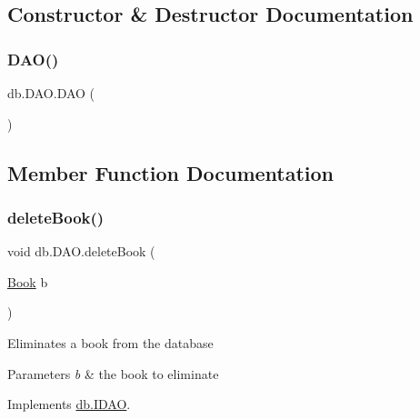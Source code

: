 \subsection{Constructor \& Destructor Documentation}
\mbox{\label{classdb_1_1_d_a_o_abd016ae9834e8d5e94d96f551d1636e7}} 
\subsubsection{\texorpdfstring{D\+A\+O()}{DAO()}}
{\footnotesize\ttfamily db.\+D\+A\+O.\+D\+AO (\begin{DoxyParamCaption}{ }\end{DoxyParamCaption})}



\subsection{Member Function Documentation}
\mbox{\label{classdb_1_1_d_a_o_a65f6a816c5f6dfb07178daf490f56fdc}} 
\subsubsection{\texorpdfstring{delete\+Book()}{deleteBook()}}
{\footnotesize\ttfamily void db.\+D\+A\+O.\+delete\+Book (\begin{DoxyParamCaption}\item[{\hyperlink{classserver_1_1data_1_1_book}{Book}}]{b }\end{DoxyParamCaption})}

Eliminates a book from the database 
\begin{DoxyParams}{Parameters}
{\em b} & the book to eliminate \\
\hline
\end{DoxyParams}


Implements \hyperlink{interfacedb_1_1_i_d_a_o_a1d6c98ea794177d7fd12c4a028ec29c1}{db.\+I\+D\+AO}.

\mbox{\label{classdb_1_1_d_a_o_aa033f83155deb72d59492bcb2b8e4d3a}} 

